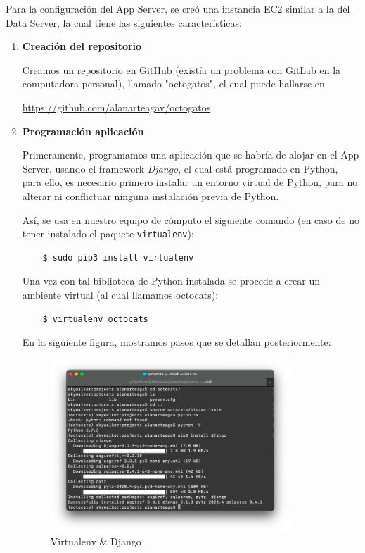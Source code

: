 \documentclass{article}
\begin{document}
Para la configuración del App Server, se creó una instancia EC2 similar
a la del Data Server, la cual tiene las siguientes características:

\begin{enumerate}

    \item {\bf Creación del repositorio}

    Creamos un repositorio en GitHub (existía un problema con GitLab en la
    computadora personal), llamado "octogatos", el cual puede hallarse en
    \begin{center}
        \url{https://github.com/alanarteagav/octogatos}
    \end{center}

    \item {\bf Programación aplicación}

    Primeramente, programamos una aplicación que se habría de alojar en el App
    Server, usando el framework {\it Django}, el cual está programado en
    Python, para ello, es necesario primero instalar un entorno virtual de
    Python, para no alterar ni conflictuar ninguna instalación previa de Python.

    Así, se usa en nuestro equipo de cómputo el siguiente comando (en caso de
    no tener instalado el paquete \texttt{virtualenv}):

    \begin{lstlisting}
    $ sudo pip3 install virtualenv
    \end{lstlisting}

    Una vez con tal biblioteca de Python instalada se procede a crear un
    ambiente virtual (al cual llamamos octocats):
    \begin{lstlisting}
    $ virtualenv octocats
    \end{lstlisting}

    En la siguiente figura, mostramos pasos que se detallan posteriormente:

    \begin{figure}[H]
      \centering
      \includegraphics[width=0.85\textwidth]{AppServer/f1}
      \caption{Virtualenv \& Django}
    \end{figure}


\end{enumerate}
\end{document}
